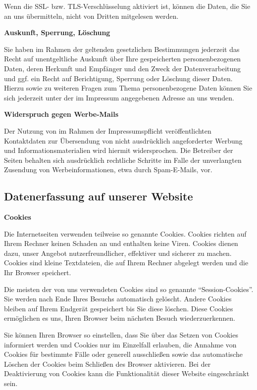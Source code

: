 \documentclass[12pt,a4paper]{scrartcl}
\begin{document}
Wenn die SSL- bzw. TLS-Verschlüsselung aktiviert ist, können die Daten,
die Sie an uns übermitteln, nicht von Dritten mitgelesen werden.

\textbf{Auskunft, Sperrung, Löschung}

Sie haben im Rahmen der geltenden gesetzlichen Bestimmungen jederzeit
das Recht auf unentgeltliche Auskunft über Ihre gespeicherten
personenbezogenen Daten, deren Herkunft und Empfänger und den Zweck der
Datenverarbeitung und ggf. ein Recht auf Berichtigung, Sperrung oder
Löschung dieser Daten. Hierzu sowie zu weiteren Fragen zum Thema
personenbezogene Daten können Sie sich jederzeit unter der im Impressum
angegebenen Adresse an uns wenden.

\textbf{Widerspruch gegen Werbe-Mails}

Der Nutzung von im Rahmen der Impressumspflicht veröffentlichten
Kontaktdaten zur Übersendung von nicht ausdrücklich angeforderter
Werbung und Informationsmaterialien wird hiermit widersprochen. Die
Betreiber der Seiten behalten sich ausdrücklich rechtliche Schritte im
Falle der unverlangten Zusendung von Werbeinformationen, etwa durch
Spam-E-Mails, vor.

\hypertarget{datenerfassung-auf-unserer-website}{%
\subsection{Datenerfassung auf unserer
Website}\label{datenerfassung-auf-unserer-website}}

\textbf{Cookies}

Die Internetseiten verwenden teilweise so genannte Cookies. Cookies
richten auf Ihrem Rechner keinen Schaden an und enthalten keine Viren.
Cookies dienen dazu, unser Angebot nutzerfreundlicher, effektiver und
sicherer zu machen. Cookies sind kleine Textdateien, die auf Ihrem
Rechner abgelegt werden und die Ihr Browser speichert.

Die meisten der von uns verwendeten Cookies sind so genannte
``Session-Cookies''. Sie werden nach Ende Ihres Besuchs automatisch
gelöscht. Andere Cookies bleiben auf Ihrem Endgerät gespeichert bis Sie
diese löschen. Diese Cookies ermöglichen es uns, Ihren Browser beim
nächsten Besuch wiederzuerkennen.

Sie können Ihren Browser so einstellen, dass Sie über das Setzen von
Cookies informiert werden und Cookies nur im Einzelfall erlauben, die
Annahme von Cookies für bestimmte Fälle oder generell ausschließen sowie
das automatische Löschen der Cookies beim Schließen des Browser
aktivieren. Bei der Deaktivierung von Cookies kann die Funktionalität
dieser Website eingeschränkt sein.
\end{document}
